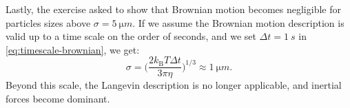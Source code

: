 Lastly, the exercise asked to show that Brownian motion becomes negligible for
particles sizes above
$\sigma = \qty{5}{\micro m}$. If we assume the Brownian motion description is
valid up to a time scale on the order of seconds, and we set $\Delta t =
\qty{1}{s}$ in \cref{eq:timescale-brownian}, we get:
\begin{equation}
  \sigma = \biggl(\frac{2k_{\mathrm{B}} T \Delta t}{3 \pi \eta}\biggr)^{1/3}
  \approx \qty{1}{\micro m}.
\end{equation}
Beyond this scale, the Langevin description is no longer applicable, and
inertial forces become dominant.
